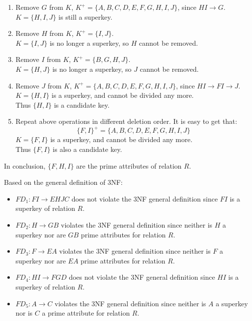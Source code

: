\documentclass[11pt,letterpaper,titlepage,en-US]{article}
\begin{document}
\begin{homeworkProblem}
\begin{homeworkSubProblem}
\begin{enumerate}[label=\textbf{Step {\arabic*}}, leftmargin=2cm]
            \item Remove $G$ from $K$, $K^+ = \{A,B,C,D,E,F,G,H,I,J\}$, since $HI \rightarrow G$.\\
                $K = \{H,I,J\}$ is still a superkey.
            \item Remove $H$ from $K$, $K^+ = \{I,J\}$. \\
                $K = \{I,J\}$ is no longer a superkey, so $H$ cannot be removed.
            \item Remove $I$ from $K$, $K^+ = \{B,G,H,J\}$. \\
                $K = \{H,J\}$ is no longer a superkey, so $J$ cannot be removed.
            \item Remove $J$ from $K$, $K^+ = \{A,B,C,D,E,F,G,H,I,J\}$, since $HI \rightarrow FI \rightarrow J$.\\
                $K = \{H,I\}$ is a superkey, and cannot be divided any more.\\
                Thus $\{H, I\}$ is a candidate key.
            \item Repeat above operations in different deletion order. It is easy to get that:\[\{F,I\}^+ = \{A,B,C,D,E,F,G,H,I,J\}\]
                $K = \{F,I\}$ is a superkey, and cannot be divided any more.\\
                Thus $\{F, I\}$ is also a candidate key.
        \end{enumerate}
        In conclusion, $\{F, H, I\}$ are the prime attributes of relation $R$.

    \end{homeworkSubProblem}

    \begin{homeworkSubProblem}
        Based on the general definition of 3NF:
        \begin{itemize}
            \item $FD_1: FI \rightarrow EHJC$ does not violate the 3NF general definition since $FI$ is a superkey of relation $R$.
            \item $FD_2: H \rightarrow GB$ violates the 3NF general definition since neither is $H$ a superkey nor are $GB$ prime attributes for relation $R$.
            \item $FD_3: F \rightarrow EA$ violates the 3NF general definition since neither is $F$ a superkey nor are $EA$ prime attributes for relation $R$.
            \item $FD_4: HI \rightarrow FGD$ does not violate the 3NF general definition since $HI$ is a superkey of relation $R$.
            \item $FD_5: A \rightarrow C$ violates the 3NF general definition since neither is $A$ a superkey nor is $C$ a prime attribute for relation $R$.
        \end{itemize}


\end{homeworkSubProblem}
\end{homeworkProblem}
\end{document}
